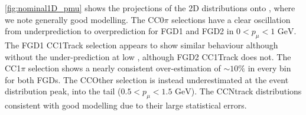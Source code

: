 
\autoref{fig:nominal1D_pmu} shows the projections of the 2D distributions onto \pmu, where we note generally good modelling. The CC0$\pi$ selections have a clear oscillation from underprediction to overprediction for FGD1 and FGD2 in $0 < p_\mu < 1 \text{ GeV}$. The FGD1 \numubar CC1Track selection appears to show similar behaviour although without the under-prediction at low \pmu, although FGD2 \numu CC1Track does not. The CC1$\pi$ selection shows a nearly consistent over-estimation of $\sim10\%$ in every bin for both FGDs. The CCOther selection is instead underestimated at the event distribution peak, into the tail ($0.5<p_\mu <1.5\text{ GeV}$). The CCNtrack distributions consistent with good modelling due to their large statistical errors.

